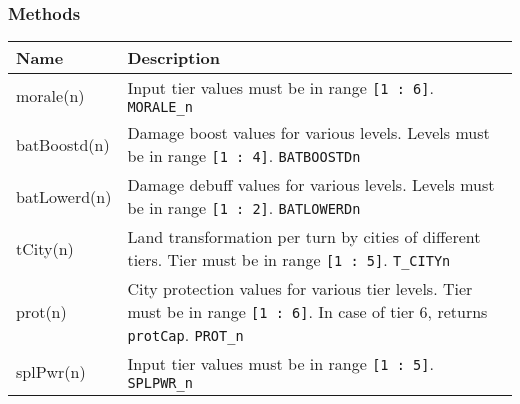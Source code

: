 \subsubsection{Methods}
\begin{center}
\begin{tabularx}{\linewidth}{| l | X |}
\hline
\textbf{Name} & \textbf{Description}\\
\hline
morale(n) & Input tier values must be in range \texttt{[1 : 6]}. \texttt{MORALE\_n}\\
\hline
batBoostd(n) & Damage boost values for various levels. Levels must be in range \texttt{[1 : 4]}. \texttt{BATBOOSTDn}\\
\hline
batLowerd(n) & Damage debuff values for various levels. Levels must be in range \texttt{[1 : 2]}. \texttt{BATLOWERDn}\\
\hline
tCity(n) & Land transformation per turn by cities of different tiers. Tier must be in range \texttt{[1 : 5]}. \texttt{T\_CITYn}\\
\hline
prot(n) & City protection values for various tier levels. Tier must be in range \texttt{[1 : 6]}. In case of tier 6, returns \texttt{protCap}. \texttt{PROT\_n}\\
\hline
splPwr(n) & Input tier values must be in range \texttt{[1 : 5]}. \texttt{SPLPWR\_n}\\
\hline
\end{tabularx}
\end{center}